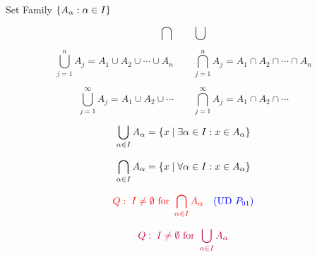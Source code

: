 \begin{frame}{}
  \centerline{\Large Set Family $\{A_{\alpha}: \alpha \in I\}$}

  \[
    \bigcap \qquad \bigcup
  \]
\end{frame}

\begin{frame}{}
    \[
      \bigcup_{j = 1}^{n} A_j = A_1 \cup A_2 \cup \cdots \cup A_n \qquad 
      \bigcap_{j = 1}^{n} A_j = A_1 \cap A_2 \cap \cdots \cap A_n
    \]

    \pause
    \vspace{1.00cm}
    \[
      \bigcup_{j = 1}^{\infty} A_j = A_1 \cup A_2 \cup \cdots \qquad 
      \bigcap_{j = 1}^{\infty} A_j = A_1 \cap A_2 \cap \cdots 
    \]
\end{frame}

\begin{frame}{}
  \[
    \bigcup_{\alpha \in I} A_{\alpha} = \{x \mid \exists \alpha \in I: x \in A_{\alpha}\}
  \]

  \[
    \bigcap_{\alpha \in I} A_{\alpha} = \{x \mid \forall \alpha \in I: x \in A_{\alpha}\}
  \]

  \pause
  \vspace{0.60cm}
  \[
    \textcolor{red}{Q: \; I \neq \emptyset \text{ for } \bigcap_{\alpha \in I} A_{\alpha}} \quad \textcolor{blue}{(\text{UD } P_{91})}
  \]

  \pause
  \vspace{0.60cm}
  \[
    \textcolor{purple}{Q: \; I \neq \emptyset \text{ for } \bigcup_{\alpha \in I} A_{\alpha}}
  \]
\end{frame}


